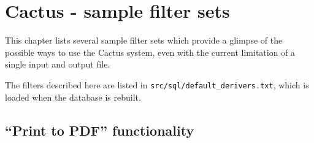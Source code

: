 









\chapter{Cactus - sample filter sets}
\label{cha:cactus-sample-filter-sets}

This chapter lists several sample filter sets which provide a glimpse
of the possible ways to use the Cactus system, even with the current
limitation of a single input and output file.

The filters described here are listed in
\texttt{src/sql/default_derivers.txt}, which is loaded when the
database is rebuilt.


\section{``Print to PDF'' functionality}
\label{sec:network-adobe-acrobat-pdf-printer}

